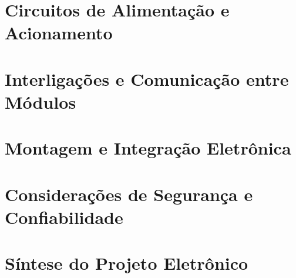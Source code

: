 \section{Circuitos de Alimentação e Acionamento}
\label{sec:alimentacao-acionamento}


\section{Interligações e Comunicação entre Módulos}
\label{sec:interligacoes}


\section{Montagem e Integração Eletrônica}
\label{sec:montagem-integracao-eletronica}


\section{Considerações de Segurança e Confiabilidade}
\label{sec:seguranca-eletronica}


\section{Síntese do Projeto Eletrônico}
\label{sec:sintese-eletronica}

